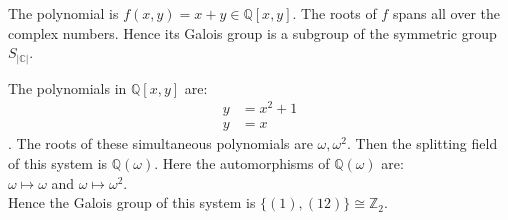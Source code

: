 \begin{example}
  The polynomial is \(f(x,y)=x+y \in \mathbb{Q}[x,y]\). The roots of \(f\) spans all over the complex numbers. Hence its Galois group is a subgroup of the symmetric group \(S_{|\mathbb{C}|}\).
\end{example}

\vspace{1mm}
\begin{example}
  The polynomials in \(\mathbb{Q}[x,y]\) are: \begin{align}
                         y &= x^2+1 \\
                         y &=x
                       \end{align}.
                       The roots of these simultaneous polynomials are \(\omega, {\omega}^2\). Then the splitting field of this system is \(\mathbb{Q}(\omega)\). Here the automorphisms of \(\mathbb{Q}(\omega)\) are: \\
       \(\omega \longmapsto \omega\) and \hspace{9mm} \(\omega \longmapsto {\omega}^2\).\\
                       Hence the Galois group of this system is \(\{(1), (12)\} \cong {\mathbb{Z}}_2\).
\end{example}

